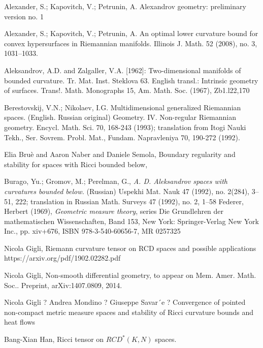 \begin{thebibliography}{52}

 Alexander, S.; Kapovitch, V.; Petrunin, A.
Alexandrov geometry: preliminary version no. 1

 Alexander, S.; Kapovitch, V.; Petrunin, A.
An optimal lower curvature bound for convex hypersurfaces in Riemannian manifolds.
Illinois J. Math. 52 (2008), no. 3, 1031--1033.

Aleksandrov, A.D. and Zalgaller, V.A. [1962]: Two-dimensional manifolds of bounded curvature.
Tr. Mat. Inst. Steklova 63. English transl.: Intrinsic geometry of surfaces. Trans!. Math. Monographs
15, Am. Math. Soc. (1967), Zb1.l22,170


Berestovskij, V.N.; Nikolaev, I.G.
Multidimensional generalized Riemannian spaces. (English. Russian original)
Geometry. IV. Non-regular Riemannian geometry. Encycl. Math. Sci. 70, 168-243 (1993); translation from Itogi Nauki Tekh., Ser. Sovrem. Probl. Mat., Fundam. Napravleniya 70, 190-272 (1992).


 Elia Bruè and Aaron Naber and Daniele Semola, Boundary regularity and stability for spaces with Ricci bounded below, 


 Burago, Yu.; Gromov, M.; Perelman, G., \textit{A. D. Aleksandrov spaces
with curvatures bounded below.} (Russian)  Uspekhi Mat. Nauk  47  (1992),  no.
2(284), 3--51, 222;   translation in  Russian Math. Surveys  47  (1992),  no. 2, 1--58
Federer, Herbert (1969), \textit{Geometric measure theory}, series Die Grundlehren der mathematischen Wissenschaften, Band 153, New York: Springer-Verlag New York Inc., pp. xiv+676, ISBN 978-3-540-60656-7, MR 0257325

Nicola Gigli,
Riemann curvature tensor on RCD spaces and possible applications https://arxiv.org/pdf/1902.02282.pdf

Nicola Gigli,
Non-smooth differential geometry, to appear on Mem. Amer. Math. Soc..
Preprint, arXiv:1407.0809, 2014.

Nicola Gigli ? Andrea Mondino ? Giuseppe Savar´e ?
Convergence of pointed non-compact metric measure spaces
and stability of Ricci curvature bounds and heat flows



 Bang-Xian Han, 
Ricci tensor on $RCD^*(K, N)$ spaces.


\end{thebibliography}
